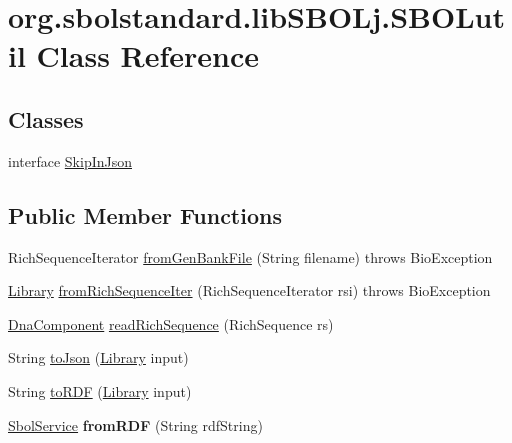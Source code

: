 \hypertarget{classorg_1_1sbolstandard_1_1lib_s_b_o_lj_1_1_s_b_o_lutil}{
\section{org.sbolstandard.libSBOLj.SBOLutil Class Reference}
\label{classorg_1_1sbolstandard_1_1lib_s_b_o_lj_1_1_s_b_o_lutil}
}
\subsection*{Classes}
\begin{DoxyCompactItemize}
\item 
interface \hyperlink{interfaceorg_1_1sbolstandard_1_1lib_s_b_o_lj_1_1_s_b_o_lutil_1_1_skip_in_json}{SkipInJson}
\end{DoxyCompactItemize}
\subsection*{Public Member Functions}
\begin{DoxyCompactItemize}
\item 
RichSequenceIterator \hyperlink{classorg_1_1sbolstandard_1_1lib_s_b_o_lj_1_1_s_b_o_lutil_af861065d53a033149b9ef1a3df87aed9}{fromGenBankFile} (String filename)  throws BioException 
\item 
\hyperlink{classorg_1_1sbolstandard_1_1lib_s_b_o_lj_1_1_library}{Library} \hyperlink{classorg_1_1sbolstandard_1_1lib_s_b_o_lj_1_1_s_b_o_lutil_adb487cad6c1ad9f5c84c1b7bbdc7dbec}{fromRichSequenceIter} (RichSequenceIterator rsi)  throws BioException 
\item 
\hyperlink{classorg_1_1sbolstandard_1_1lib_s_b_o_lj_1_1_dna_component}{DnaComponent} \hyperlink{classorg_1_1sbolstandard_1_1lib_s_b_o_lj_1_1_s_b_o_lutil_a57f85ac9e2ce0a55452b29d308df8c42}{readRichSequence} (RichSequence rs)
\item 
String \hyperlink{classorg_1_1sbolstandard_1_1lib_s_b_o_lj_1_1_s_b_o_lutil_ae5804516e781d98986a524496f849866}{toJson} (\hyperlink{classorg_1_1sbolstandard_1_1lib_s_b_o_lj_1_1_library}{Library} input)
\item 
String \hyperlink{classorg_1_1sbolstandard_1_1lib_s_b_o_lj_1_1_s_b_o_lutil_a5a90621483a3966e8f26d12f06172bc0}{toRDF} (\hyperlink{classorg_1_1sbolstandard_1_1lib_s_b_o_lj_1_1_library}{Library} input)
\item 
\hypertarget{classorg_1_1sbolstandard_1_1lib_s_b_o_lj_1_1_s_b_o_lutil_a66b263a3ca73c13fb9cf801dadeaf82b}{
\hyperlink{classorg_1_1sbolstandard_1_1lib_s_b_o_lj_1_1_sbol_service}{SbolService} {\bfseries fromRDF} (String rdfString)}
\label{classorg_1_1sbolstandard_1_1lib_s_b_o_lj_1_1_s_b_o_lutil_a66b263a3ca73c13fb9cf801dadeaf82b}

\end{DoxyCompactItemize}


